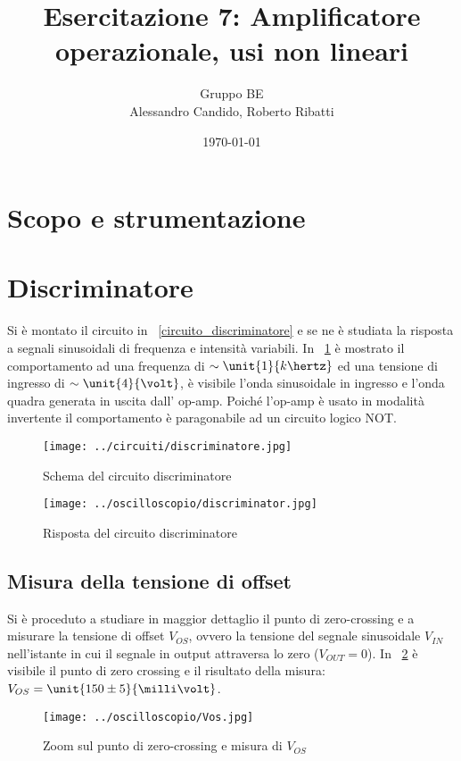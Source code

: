 \documentclass[10pt,a4paper]{article}
\title{Esercitazione 7: Amplificatore operazionale, usi non lineari}
\author{Gruppo BE \\ Alessandro Candido, Roberto Ribatti}
\date{\today}
\begin{document}
\maketitle

\section{Scopo e strumentazione}

\section{Discriminatore}
Si è montato il circuito in \figurename{~\ref{circuito_discriminatore}} e se ne è studiata la risposta a segnali sinusoidali di frequenza e intensità variabili. In \figurename{~\ref{fig:discriminator}} è mostrato il comportamento ad una frequenza di $\sim \unit{1}{k\hertz}$ ed una tensione di ingresso di $\sim\unit{4}{\volt}$, è visibile l'onda sinusoidale in ingresso e l'onda quadra generata in uscita dall' op-amp. Poiché l'op-amp è usato in modalità invertente il comportamento è paragonabile ad un circuito logico NOT.

\begin{figure}[H]
	\begin{minipage}{0.49\textwidth}
		\centering
		\texttt{[image: ../circuiti/discriminatore.jpg]}
		\caption{Schema del circuito discriminatore}
		\label{circuito_discriminatore}
	\end{minipage}
	\begin{minipage}{0.49\textwidth}
		\centering
		\texttt{[image: ../oscilloscopio/discriminator.jpg]}
		\caption{Risposta del circuito discriminatore}
		\label{fig:discriminator}
	\end{minipage}
\end{figure}

\subsection{Misura della tensione di offset}
Si è proceduto a studiare in maggior dettaglio il punto di zero-crossing e a misurare la tensione di offset $V_{OS}$, ovvero la tensione del segnale sinusoidale $V_{IN}$ nell'istante in cui il segnale in output attraversa lo zero ($V_{OUT}=0$). In \figurename{~\ref{fig:vos}} è visibile il punto di zero crossing e il risultato della misura: $V_{OS} = \unit{150 \pm 5}{\milli\volt}$.

\begin{figure}[H]
	\centering
	\texttt{[image: ../oscilloscopio/Vos.jpg]}
	\caption{Zoom sul punto di zero-crossing e misura di $V_{OS}$}
	\label{fig:vos}
\end{figure}
\end{document}
